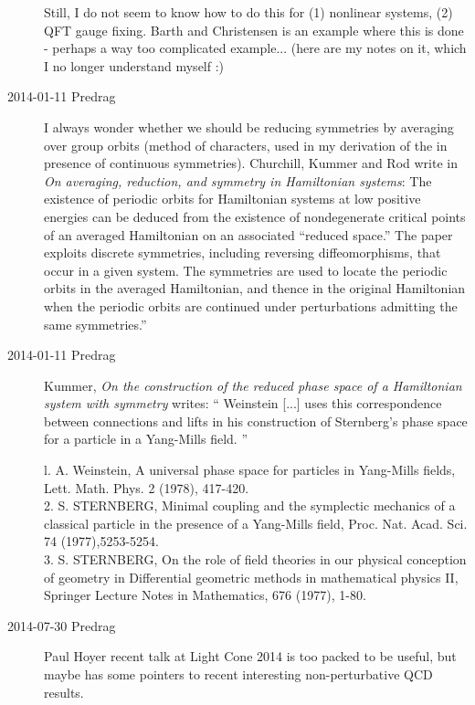 \begin{description}
Still, I do not seem to know how to do this for (1) nonlinear systems,
(2) QFT gauge fixing. Barth and Christensen  is an example
where this is done - perhaps a way too complicated example... (here are
my notes 
{on it}, which I no longer understand myself :)

\item[2014-01-11 Predrag]
I always wonder whether we should be reducing symmetries
by averaging over group orbits (method of characters, used in
my derivation of the {\Fd} in presence of continuous symmetries).
Churchill, Kummer and Rod write in
{\em On averaging, reduction, and symmetry in {Hamiltonian} systems}:
The existence of periodic orbits for Hamiltonian systems at
low positive energies can be deduced from the existence of nondegenerate
critical points of an averaged Hamiltonian on an associated ``reduced
space.'' The paper exploits discrete symmetries, including reversing
diffeomorphisms, that occur in a given system. The symmetries are used to
locate the periodic orbits in the averaged Hamiltonian, and thence in the
original Hamiltonian when the periodic orbits are continued under
perturbations admitting the same symmetries.''

\item[2014-01-11 Predrag]
Kummer, {\em On the construction of the reduced phase space
of a {Hamiltonian} system with symmetry} writes:
``
Weinstein [...] uses this correspondence between connections
and lifts in his construction of Sternberg's phase space for a
particle in a Yang-Mills field.
''

l. A. Weinstein, A universal phase space for particles in Yang-Mills
fields, Lett. Math. Phys. 2 (1978), 417-420. \\
2. S. STERNBERG, Minimal coupling and the symplectic mechanics of a
classical particle in the presence of a Yang-Mills field, Proc. Nat.
Acad. Sci. 74 (1977),5253-5254. \\
3. S. STERNBERG, On the role of field theories in our physical conception
of geometry in Differential geometric methods in mathematical physics II,
Springer Lecture Notes in Mathematics,
676 (1977), 1-80. \\

\item[2014-07-30 Predrag]
Paul Hoyer recent talk at
{Light Cone 2014} is too packed to be useful, but maybe has some pointers
to recent interesting non-perturbative QCD results.


\end{description}
